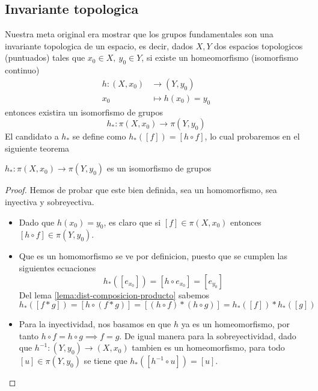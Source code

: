 \subsection{Invariante topologica}
Nuestra meta original era mostrar que los grupos fundamentales son una
invariante topologica de un espacio, es decir, dados \(X,Y\) dos
espacios topologicos (puntuados) tales que \(x_0 \in X,\ y_0 \in Y\), si
existe un homeomorfismo (isomorfismo continuo)
\begin{align*}
  h : (X, x_0) &\to (Y, y_0) \\
  x_0 &\mapsto h(x_0) = y_0
\end{align*}
entonces existira un isomorfismo de grupos
\[ h_{*} : \pi (X, x_0) \to \pi (Y, y_0) \]
El candidato a \(h_{*}\) se define como \(h_{*} ([f]) = [h \circ f] \),
lo cual probaremos en el siguiente teorema
\begin{teorema}
\(h_{*} : \pi (X, x_0) \to \pi (Y, y_0)\) es un isomorfismo de grupos
\end{teorema}
\begin{proof}
  Hemos de probar que este bien definida, sea un homomorfismo, sea
  inyectiva y sobreyectiva.
  \begin{itemize}
  \item Dado que \(h(x_0) = y_0\), es
    claro que si \([f] \in \pi (X, x_0) \) entonces \( [h \circ f] \in
    \pi (Y, y_0)\).

  \item Que es un homomorfismo se ve por definicion, puesto que se cumplen
    las siguientes ecuaciones
    \[ h_{*} ([e_{x_0}]) = [h \circ e_{x_0}] = [e_{y_0}]\]
    Del lema \ref{lema:dist-composicion-producto} sabemos
    \[ h_{*} ([f * g]) = [h \circ (f * g)] = [(h \circ f) * (h \circ g)]
      = h_{*} ([f]) * h_{*} ([g])\]

  \item Para la inyectividad, nos basamos en que \(h\) ya es un
    homeomorfismo, por tanto \( h \circ f = h \circ g \implies f = g \).
    De igual manera para la sobreyectividad, dado que \(h^{-1} : (Y,y_0)
    \to (X, x_0)\) tambien es un homeomorfismo, para todo \([u] \in \pi
    (Y, y_0) \) se tiene que \(h_{*} ([h^{-1} \circ u]) = [u]\).
  \end{itemize}
\end{proof}

